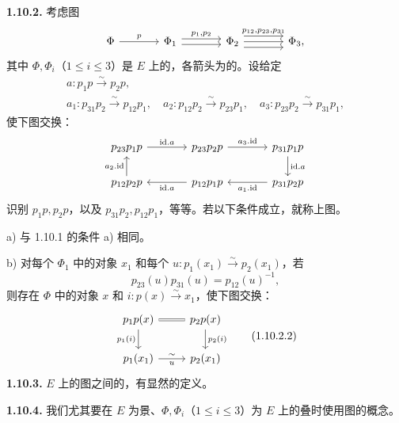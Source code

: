 \textbf{1.10.2.} 考虑图
\[
\begin{tikzcd}[column sep=large]
\Phi\arrow[r,"p"]&\Phi_1\arrow[r,shift left=.6ex,"{p_1,p_2}"]\arrow[r,shift right=.6ex]&\Phi_2\arrow[r,shift left=1.2ex,"{p_{12},p_{23},p_{31}}"]\arrow[r]\arrow[r,shift right=1.2ex]&\Phi_3,
\end{tikzcd}
\]
其中 $\Phi,\Phi_i$（$1\leqslant i\leqslant3$）是 $E$ 上的，各箭头为的。设给定
\[
\begin{gathered}
a:p_1p\xrightarrow{\sim}p_2p,\\
a_1:p_{31}p_2\xrightarrow{\sim}p_{12}p_1,\quad
a_2:p_{12}p_2\xrightarrow{\sim}p_{23}p_1,\quad
a_3:p_{23}p_2\xrightarrow{\sim}p_{31}p_1,
\end{gathered}
\]
使下图交换：
\[
\begin{tikzcd}[column sep=large]
p_{23}p_1p\arrow[r,"\mathrm{id}.a"]&p_{23}p_2p\arrow[r,"a_3.\mathrm{id}"]&p_{31}p_1p\arrow[d,"\mathrm{id}.a"]\\
p_{12}p_2p\arrow[u,"a_2.\mathrm{id}"]&p_{12}p_1p\arrow[l,"\mathrm{id}.a"]&p_{31}p_2p\arrow[l,"a_1.\mathrm{id}"]
\end{tikzcd}
\]
识别 $p_1p,p_2p$，以及 $p_{31}p_2,p_{12}p_1$，等等。若以下条件成立，就称上图。

a) 与 1.10.1 的条件 a) 相同。

b) 对每个 $\Phi_1$ 中的对象 $x_1$ 和每个 $u:p_1(x_1)\xrightarrow{\sim}p_2(x_1)$，若
\[p_{23}(u)p_{31}(u)=p_{12}(u)^{-1},\tag{1.10.2.1}\]
则存在 $\Phi$ 中的对象 $x$ 和 $i:p(x)\xrightarrow{\sim}x_1$，使下图交换：
\[
\begin{tikzcd}
p_1p(x)\arrow[r,equal]\arrow[d,"p_1(i)"']&p_2p(x)\arrow[d,"p_2(i)"]\\
p_1(x_1)\arrow[r,"u"',"\sim"]&p_2(x_1)
\end{tikzcd}\tag{1.10.2.2}
\]
\textbf{1.10.3.} $E$ 上的图之间的，有显然的定义。

\textbf{1.10.4.} 我们尤其要在 $E$ 为景、$\Phi,\Phi_i$（$1\leqslant i\leqslant3$）为 $E$ 上的叠时使用图的概念。

